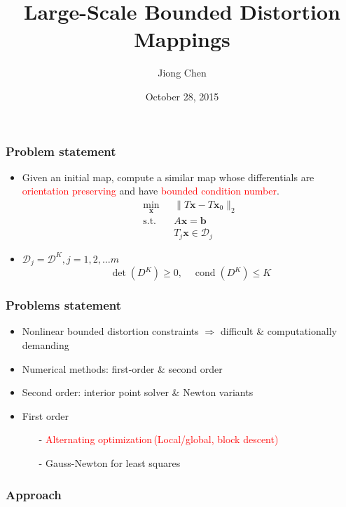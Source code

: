 \documentclass[serif,mathserif]{beamer}
\author[Jiong Chen]{Jiong Chen}
\title[\hspace{2em}\insertframenumber/\inserttotalframenumber]{Large-Scale Bounded Distortion Mappings}
\date{October 28, 2015} %
\newcommand{\BOLD}[1]{\mathbf{#1}}
\newcommand{\TODO}[1]{\textcolor{red}{#1}}
\DeclareMathOperator{\cond}{cond}
\DeclareMathOperator{\ST}{s.t.}
\begin{document}
\maketitle

\begin{frame}
 \frametitle{Problem statement}
 \begin{itemize}
  \item Given an initial map, compute a similar map whose differentials are \TODO{orientation preserving}
  and have \TODO{bounded condition number}.
  \Large
 \begin{equation*}
 \boxed{
  \begin{aligned}
    \min_{\BOLD{x}}~~&\|T\BOLD{x}-T\BOLD{x}_0\|_2  \\ 
    \ST \quad &A\BOLD{x} = \BOLD{b}\\
    &T_j\BOLD{x} \in \mathcal{D}_j
  \end{aligned}
 }
 \end{equation*}
 \large
 \item $\mathcal{D}_j=\mathcal{D}^K, j=1,2,\dots m$
 \begin{equation*}
  \det(D^K) \ge  0, \quad \cond(D^K) \le K
 \end{equation*}
 \end{itemize}
\end{frame}

\begin{frame}
 \frametitle{Problems statement}
 \begin{itemize}
  \item Nonlinear bounded distortion constraints $\Rightarrow$ difficult \& computationally demanding
  \item Numerical methods: first-order \& second order
  \item Second order: interior point solver \& Newton variants
  \item First order 
    \begin{itemize}
     \item[-] \textcolor{red}{Alternating optimization\,(Local/global, block descent)}
     \item[-] \textcolor{green!50!black}{Gauss-Newton for least squares}
    \end{itemize}
 \end{itemize}
\end{frame}

\begin{frame}
 \frametitle{Approach}
\end{frame}
\end{document}
